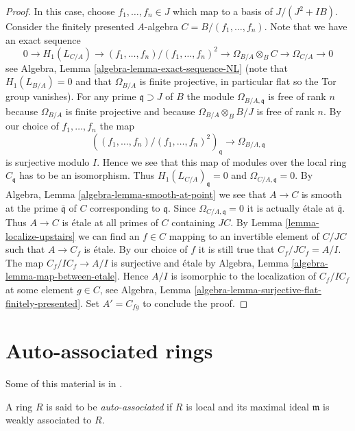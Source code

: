\begin{proof}
\medskip\noindent
In this case, choose $f_1, \ldots, f_n \in J$ which map to a
basis of $J/(J^2 + IB)$. Consider the finitely presented $A$-algebra
$C = B/(f_1, \ldots, f_n)$. Note that we have an exact sequence
$$
0 \to H_1(L_{C/A}) \to (f_1, \ldots, f_n)/(f_1, \ldots, f_n)^2
\to \Omega_{B/A} \otimes_B C \to \Omega_{C/A} \to 0
$$
see Algebra, Lemma \ref{algebra-lemma-exact-sequence-NL} (note that
$H_1(L_{B/A}) = 0$ and that $\Omega_{B/A}$ is finite projective,
in particular flat so the Tor group vanishes). For any prime
$\mathfrak q \supset J$ of $B$ the module $\Omega_{B/A, \mathfrak q}$
is free of rank $n$ because $\Omega_{B/A}$ is finite projective and
because $\Omega_{B/A} \otimes_B B/J$ is free of rank $n$. By our choice
of $f_1, \ldots, f_n$ the map
$$
\left((f_1, \ldots, f_n)/(f_1, \ldots, f_n)^2\right)_{\mathfrak q}
\to
\Omega_{B/A, \mathfrak q}
$$
is surjective modulo $I$. Hence we see that this map of modules over
the local ring $C_{\mathfrak q}$ has to be an isomorphism. Thus
$H_1(L_{C/A})_{\mathfrak q} = 0$ and $\Omega_{C/A, \mathfrak q} = 0$. By
Algebra, Lemma \ref{algebra-lemma-smooth-at-point}
we see that $A \to C$ is smooth at the prime $\overline{\mathfrak q}$
of $C$ corresponding to $\mathfrak q$. Since
$\Omega_{C/A, \mathfrak q} = 0$ it is actually \'etale at
$\overline{\mathfrak q}$. Thus $A \to C$ is \'etale at all primes
of $C$ containing $JC$. By Lemma \ref{lemma-localize-upstairs}
we can find an $f \in C$ mapping to an invertible element of $C/JC$ such that
$A \to C_f$ is \'etale. By our choice of $f$ it is still true that
$C_f/JC_f = A/I$. The map $C_f/IC_f \to A/I$ is surjective and
\'etale by Algebra, Lemma \ref{algebra-lemma-map-between-etale}.
Hence $A/I$ is isomorphic to the localization of $C_f/IC_f$ at
some element $g \in C$, see
Algebra, Lemma \ref{algebra-lemma-surjective-flat-finitely-presented}.
Set $A' = C_{fg}$ to conclude the proof.
\end{proof}









\section{Auto-associated rings}
\label{section-auto-ass}

\noindent
Some of this material is in \cite{Autour}.

\begin{definition}
\label{definition-auto-ass}
A ring $R$ is said to be {\it auto-associated} if $R$ is local and its
maximal ideal $\mathfrak m$ is weakly associated to $R$.
\end{definition}

